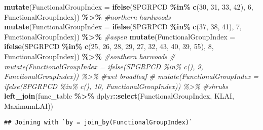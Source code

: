 \documentclass[
]{article}
\newenvironment{Shaded}{\begin{snugshade}}{\end{snugshade}}
\newcommand{\AttributeTok}[1]{\textcolor[rgb]{0.13,0.29,0.53}{#1}}
\newcommand{\CommentTok}[1]{\textcolor[rgb]{0.56,0.35,0.01}{\textit{#1}}}
\newcommand{\DecValTok}[1]{\textcolor[rgb]{0.00,0.00,0.81}{#1}}
\newcommand{\FunctionTok}[1]{\textcolor[rgb]{0.13,0.29,0.53}{\textbf{#1}}}
\newcommand{\NormalTok}[1]{#1}
\newcommand{\OtherTok}[1]{\textcolor[rgb]{0.56,0.35,0.01}{#1}}
\newcommand{\SpecialCharTok}[1]{\textcolor[rgb]{0.81,0.36,0.00}{\textbf{#1}}}
\newcommand{\StringTok}[1]{\textcolor[rgb]{0.31,0.60,0.02}{#1}}
\begin{document}
\begin{Shaded}
\begin{Highlighting}[]
  \FunctionTok{mutate}\NormalTok{(}\AttributeTok{FunctionalGroupIndex =} \FunctionTok{ifelse}\NormalTok{(SPGRPCD }\SpecialCharTok{\%in\%} \FunctionTok{c}\NormalTok{(}\DecValTok{30}\NormalTok{, }\DecValTok{31}\NormalTok{, }\DecValTok{33}\NormalTok{, }\DecValTok{42}\NormalTok{), }\DecValTok{6}\NormalTok{, FunctionalGroupIndex)) }\SpecialCharTok{\%\textgreater{}\%} \CommentTok{\#northern hardwoods}
  \FunctionTok{mutate}\NormalTok{(}\AttributeTok{FunctionalGroupIndex =} \FunctionTok{ifelse}\NormalTok{(SPGRPCD }\SpecialCharTok{\%in\%} \FunctionTok{c}\NormalTok{(}\DecValTok{37}\NormalTok{, }\DecValTok{38}\NormalTok{, }\DecValTok{41}\NormalTok{), }\DecValTok{7}\NormalTok{, FunctionalGroupIndex)) }\SpecialCharTok{\%\textgreater{}\%} \CommentTok{\#aspen}
  \FunctionTok{mutate}\NormalTok{(}\AttributeTok{FunctionalGroupIndex =} \FunctionTok{ifelse}\NormalTok{(SPGRPCD }\SpecialCharTok{\%in\%} \FunctionTok{c}\NormalTok{(}\DecValTok{25}\NormalTok{, }\DecValTok{26}\NormalTok{, }\DecValTok{28}\NormalTok{, }\DecValTok{29}\NormalTok{, }\DecValTok{27}\NormalTok{, }\DecValTok{32}\NormalTok{, }\DecValTok{43}\NormalTok{, }\DecValTok{40}\NormalTok{, }\DecValTok{39}\NormalTok{, }\DecValTok{55}\NormalTok{), }\DecValTok{8}\NormalTok{, FunctionalGroupIndex)) }\SpecialCharTok{\%\textgreater{}\%} \CommentTok{\#southern harwoods}
  \CommentTok{\# mutate(FunctionalGroupIndex = ifelse(SPGRPCD \%in\% c(), 9, FunctionalGroupIndex)) \%\textgreater{}\% \#wet broadleaf }
  \CommentTok{\# mutate(FunctionalGroupIndex = ifelse(SPGRPCD \%in\% c(), 10, FunctionalGroupIndex)) \%\textgreater{}\% \#shrubs}
  \FunctionTok{left\_join}\NormalTok{(func\_table }\SpecialCharTok{\%\textgreater{}\%}\NormalTok{ dplyr}\SpecialCharTok{::}\FunctionTok{select}\NormalTok{(FunctionalGroupIndex, KLAI, MaximumLAI))}
\end{Highlighting}
\end{Shaded}

\begin{verbatim}
## Joining with `by = join_by(FunctionalGroupIndex)`
\end{verbatim}

\begin{Shaded}
\end{Shaded}
\end{document}
